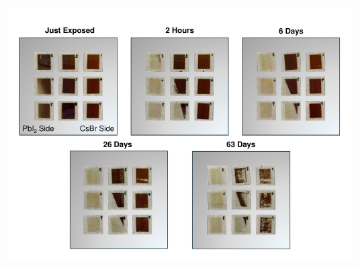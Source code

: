 \begin{figure}[htbp]
    \centering
    \begin{subfigure}[t]{0.99\textwidth}
        \centering
        \includegraphics[width=\textwidth]{chapters/stability/imeges/Stability_No_Rotation_275_on_nio.pdf} %
    \end{subfigure}

    \caption{}
    \label{}
\end{figure}


